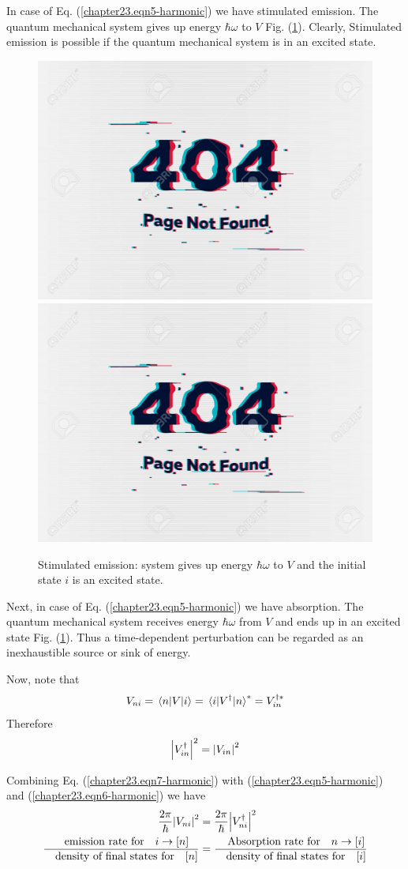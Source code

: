 In case of Eq. (\ref{chapter23.eqn5-harmonic}) we have stimulated emission. The quantum mechanical system gives up energy $\hbar\omega$ to $V$ Fig. (\ref{chapter23.fig3}). Clearly, Stimulated emission is possible if the quantum mechanical system is in an excited state.

\begin{figure}
	\centering
	\includegraphics[width=0.4\linewidth]{Pictures/not-found.jpg}
	\includegraphics[width=0.4\linewidth]{Pictures/not-found.jpg}
	\caption{Stimulated emission: system gives up energy $\hbar\omega$ to $V$ and the initial state $i$ is an excited state.}
	\label{chapter23.fig3}
\end{figure}


Next, 
in case of Eq. (\ref{chapter23.eqn5-harmonic}) we have absorption. The quantum mechanical system receives energy $\hbar\omega$ from $V$ and ends up in an excited state Fig. (\ref{chapter23.fig3}). Thus a time-dependent perturbation can be regarded as an inexhaustible source or sink of energy.


Now, note that
\begin{equation}
V_{n i} = \mel{n}{V}{i} = \mel{i}{V^\dagger}{n}^* = V_{i n}^{\dagger *}
\end{equation}
Therefore
\begin{equation}
\label{chapter23.eqn7-harmonic}
	\abs{V_{i n}^\dagger}^2 = \abs{V_{i n}}^2
\end{equation}

Combining Eq. (\ref{chapter23.eqn7-harmonic}) with (\ref{chapter23.eqn5-harmonic}) and (\ref{chapter23.eqn6-harmonic}) we have
\begin{align}
\label{chapter23.eqn8-harmonic}
\begin{split}
 \frac{2 \pi}{\hbar} \abs{V_{n i}}^2 &= \frac{2 \pi}{\hbar} \abs{V_{n i}^\dagger}^2   \\
  \frac{\qq{emission rate for} i \rightarrow [n]}{\qq{density of final states for} [n]} &=
\frac{\qq{Absorption rate for} n \rightarrow [i]}{\qq{density of final states for} [i]} 
\end{split}
\end{align}

